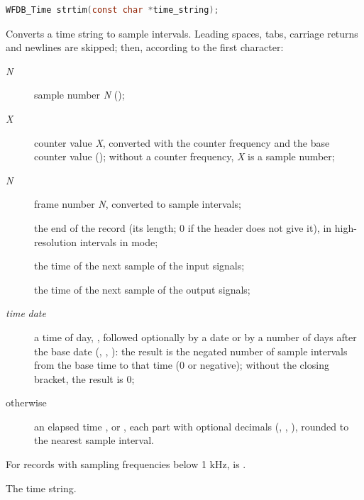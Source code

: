 \begin{lstlisting}[language=C,style=signature]
WFDB_Time strtim(const char *time_string);
\end{lstlisting}
Converts a time string to sample intervals. Leading spaces, tabs, carriage
returns and newlines are skipped; then, according to the first character:
\begin{description}
\item[\emph{N}] sample number \emph{N} ();
\item[\emph{X}] counter value \emph{X}, converted with the counter
  frequency and the base counter value (); without a counter
  frequency, \emph{X} is a sample number;
\item[\emph{N}] frame number \emph{N}, converted to sample intervals;
\item[] the end of the record (its length; 0 if the header does not
  give it), in high-resolution intervals in  mode;
\item[] the time of the next sample of the input signals;
\item[] the time of the next sample of the output signals;
\item[\code{[}\emph{time} \emph{date}\code{]}] a time of day, \code{[hh:mm:ss]},
  followed optionally by a date  or by a number of days after
  the base date (\code{[13:6:0]}, \code{[8:0:0 1]}, \code{[12:0:0 1/3/1992]}):
  the result is the negated number of sample intervals from the base time to
  that time (0 or negative); without the closing bracket, the result is 0;
\item[otherwise] an elapsed time ,  or , each
  part with optional decimals (, , ),
  rounded to the nearest sample interval.
\end{description}
For records with sampling frequencies below 1 kHz,
 is .
\begin{params}
\item[time\_string] The time string.
\end{params}

